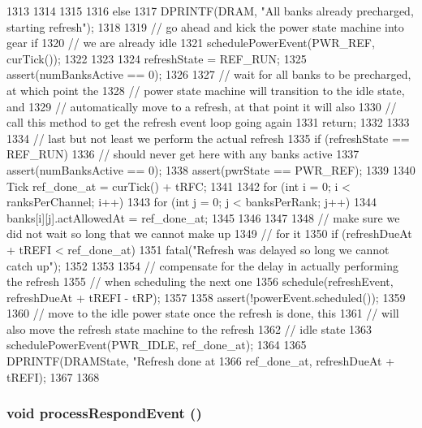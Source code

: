 \begin{DoxyCode}
{{{{{{1313                     }
1314                 }
1315             }
1316         } else {
1317             DPRINTF(DRAM, "All banks already precharged, starting refresh\n");
1318 
1319             // go ahead and kick the power state machine into gear if
1320             // we are already idle
1321             schedulePowerEvent(PWR_REF, curTick());
1322         }
1323 
1324         refreshState = REF_RUN;
1325         assert(numBanksActive == 0);
1326 
1327         // wait for all banks to be precharged, at which point the
1328         // power state machine will transition to the idle state, and
1329         // automatically move to a refresh, at that point it will also
1330         // call this method to get the refresh event loop going again
1331         return;
1332     }
1333 
1334     // last but not least we perform the actual refresh
1335     if (refreshState == REF_RUN) {
1336         // should never get here with any banks active
1337         assert(numBanksActive == 0);
1338         assert(pwrState == PWR_REF);
1339 
1340         Tick ref_done_at = curTick() + tRFC;
1341 
1342         for (int i = 0; i < ranksPerChannel; i++) {
1343             for (int j = 0; j < banksPerRank; j++) {
1344                 banks[i][j].actAllowedAt = ref_done_at;
1345             }
1346         }
1347 
1348         // make sure we did not wait so long that we cannot make up
1349         // for it
1350         if (refreshDueAt + tREFI < ref_done_at) {
1351             fatal("Refresh was delayed so long we cannot catch up\n");
1352         }
1353 
1354         // compensate for the delay in actually performing the refresh
1355         // when scheduling the next one
1356         schedule(refreshEvent, refreshDueAt + tREFI - tRP);
1357 
1358         assert(!powerEvent.scheduled());
1359 
1360         // move to the idle power state once the refresh is done, this
1361         // will also move the refresh state machine to the refresh
1362         // idle state
1363         schedulePowerEvent(PWR_IDLE, ref_done_at);
1364 
1365         DPRINTF(DRAMState, "Refresh done at %
1366                 ref_done_at, refreshDueAt + tREFI);
1367     }
1368 }
\end{DoxyCode}
\hypertarget{classDRAMCtrl_ab4cdaf6d543d6785652264ff7ebbecac}{
\subsubsection[{processRespondEvent}]{\setlength{\rightskip}{0pt plus 5cm}void processRespondEvent ()}}
\label{classDRAMCtrl_ab4cdaf6d543d6785652264ff7ebbecac}



